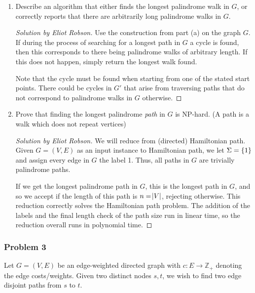 \documentclass{article}
\newenvironment{solution}[1]{\begin{proof}[Solution by #1]}{\end{proof}}
\begin{document}
\begin{enumerate}
    \item Describe an algorithm that either finds the longest palindrome walk in \(G\), or correctly reports that there are arbitrarily long palindrome walks in \(G\).
    
    \begin{solution}{Eliot Robson}
        Use the construction from part (a) on the graph \(G\). If during the process of searching for a longest path in \(G\) a cycle is found, then this corresponds to there being palindrome walks of arbitrary length. If this does not happen, simply return the longest walk found.
        
        Note that the cycle must be found when starting from one of the stated start points. There could be cycles in \(G'\) that arise from traversing paths that do not correspond to palindrome walks in \(G\) otherwise.
    \end{solution}
    
    \item Prove that finding the longest palindrome \textit{path} in \(G\) is NP-hard. (A path is a walk which does not repeat vertices)
    
    \begin{solution}{Eliot Robson}
        We will reduce from (directed) Hamiltonian path. Given \(G = (V, E)\) as an input instance to Hamiltonian path, we let \(\Sigma = \set{1}\) and assign every edge in \(G\) the label 1. Thus, all paths in \(G\) are trivially palindrome paths.
        
        If we get the longest palindrome path in \(G\), this is the longest path in \(G\), and so we accept if the length of this path is \(n = \abs{V}\), rejecting otherwise. This reduction correctly solves the Hamiltonian path problem. The addition of the labels and the final length check of the path size run in linear time, so the reduction overall runs in polynomial time.
    \end{solution}
\end{enumerate}

\subsubsection{Problem 3}
Let \(G = (V,E)\) be an edge-weighted directed graph with \(c : E \to \mathbb{Z}_+\) denoting the edge costs/weights. Given two distinct nodes \(s,t\), we wish to find two edge disjoint paths from \(s\) to \(t\).
\end{document}
